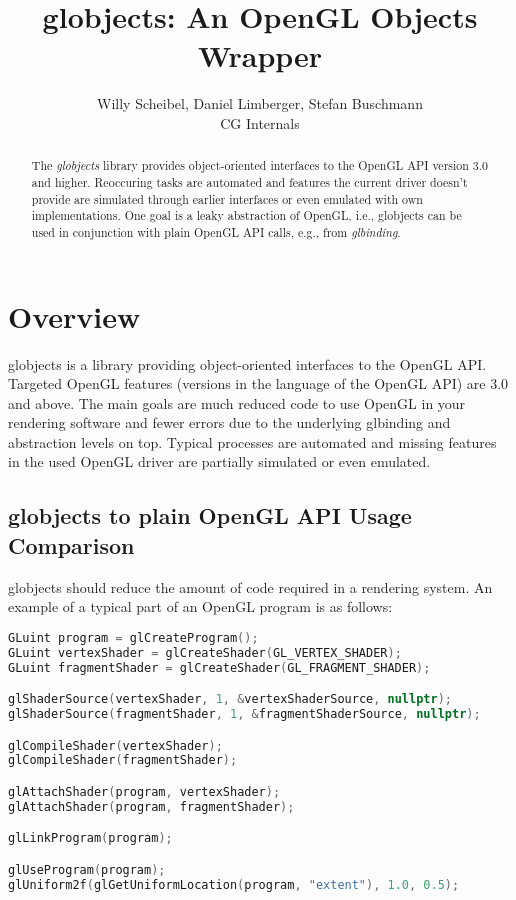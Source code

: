 \documentclass{article}
\begin{document}
\title{globjects: An OpenGL Objects Wrapper}
\author{Willy Scheibel, Daniel Limberger, Stefan Buschmann\\CG Internals}

\maketitle

\begin{abstract}
\noindent
The \emph{globjects} library provides object-oriented interfaces to the OpenGL API version 3.0 and higher. Reoccuring tasks are automated and features the current driver doesn't provide are simulated through earlier interfaces or even emulated with own implementations. One goal is a leaky abstraction of OpenGL, i.e., globjects can be used in conjunction with plain OpenGL API calls, e.g., from \emph{glbinding}.

\end{abstract}

\setcounter{tocdepth}{1}
\tableofcontents

\newpage

\section{Overview}

globjects is a library providing object-oriented interfaces to the OpenGL API. Targeted OpenGL features (versions in the language of the OpenGL API) are 3.0 and above.
The main goals are much reduced code to use OpenGL in your rendering software and fewer errors due to the underlying glbinding and abstraction levels on top. Typical processes are automated and missing features in the used OpenGL driver are partially simulated or even emulated.

\subsection{globjects to plain OpenGL API Usage Comparison}

globjects should reduce the amount of code required in a rendering system. An example of a typical part of an OpenGL program is as follows:

\begin{lstlisting}[language=c++,frame=single,basicstyle=\footnotesize]
GLuint program = glCreateProgram();
GLuint vertexShader = glCreateShader(GL_VERTEX_SHADER);
GLuint fragmentShader = glCreateShader(GL_FRAGMENT_SHADER);

glShaderSource(vertexShader, 1, &vertexShaderSource, nullptr);
glShaderSource(fragmentShader, 1, &fragmentShaderSource, nullptr);

glCompileShader(vertexShader);
glCompileShader(fragmentShader);

glAttachShader(program, vertexShader);
glAttachShader(program, fragmentShader);

glLinkProgram(program);

glUseProgram(program);
glUniform2f(glGetUniformLocation(program, "extent"), 1.0, 0.5);
\end{lstlisting}
\end{document}
